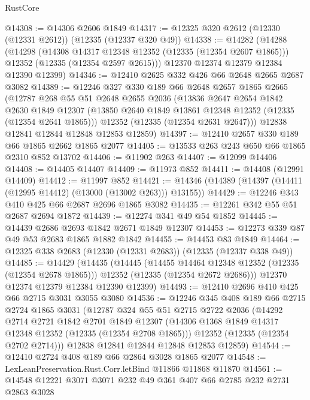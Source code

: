 \begin{lexlean}{RustCore}
\begin{coremodule}
@14308 := @14306 @2606 @1849
@14317 := @12325 @320 @2612 (@12330 (@12331 @2612)) (@12335 (@12337 @320 @49))
@14338 := @14282
    (@14288
      (@14298
        (@14308 @14317 @12348 @12352 (@12335 (@12354 @2607 @1865)))
        @12352
        (@12335 (@12354 @2597 @2615)))
      @12370
      @12374
      @12379
      @12384
      @12390
      @12399)
@14346 := @12410 @2625 @332 @426 @66 @2648 @2665 @2687 @3082
@14389 := @12246
    @327
    @330
    @189
    @66
    @2648
    @2657
    @1865
    @2665
    (@12787
      @268
      @55
      @51
      @2648
      @2655
      @2036
      (@13836
        @2647
        @2654
        @1842
        @2630
        @1849
        @12307
        (@13850 @2640 @1849 @13861 @12348 @12352 (@12335 (@12354 @2641 @1865)))
        @12352
        (@12335 (@12354 @2631 @2647)))
      @12838
      @12841
      @12844
      @12848
      @12853
      @12859)
@14397 := @12410 @2657 @330 @189 @66 @1865 @2662 @1865 @2077
@14405 := @13533 @263 @243 @650 @66 @1865 @2310 @852 @13702
@14406 := @11902 @263
@14407 := @12099 @14406
@14408 := @14405 @14407
@14409 := @11973 @852
@14411 := @14408 (@12991 @14409)
@14412 := @11997 @852
@14421 := @14346 (@14389 (@14397 (@14411 (@12995 @14412) (@13000 (@13002 @263))) @13155))
@14429 := @12246 @343 @410 @425 @66 @2687 @2696 @1865 @3082
@14435 := @12261 @342 @55 @51 @2687 @2694 @1872
@14439 := @12274 @341 @49 @54 @1852
@14445 := @14439 @2686 @2693 @1842 @2671 @1849 @12307
@14453 := @12273 @339 @87 @49 @53 @2683 @1865 @1882 @1842
@14455 := @14453 @83 @1849
@14464 := @12325 @338 @2683 (@12330 (@12331 @2683)) (@12335 (@12337 @338 @49))
@14485 := @14429
    (@14435
      (@14445
        (@14455 @14464 @12348 @12352 (@12335 (@12354 @2678 @1865)))
        @12352
        (@12335 (@12354 @2672 @2686)))
      @12370
      @12374
      @12379
      @12384
      @12390
      @12399)
@14493 := @12410 @2696 @410 @425 @66 @2715 @3031 @3055 @3080
@14536 := @12246
    @345
    @408
    @189
    @66
    @2715
    @2724
    @1865
    @3031
    (@12787
      @324
      @55
      @51
      @2715
      @2722
      @2036
      (@14292
        @2714
        @2721
        @1842
        @2701
        @1849
        @12307
        (@14306 @1368 @1849 @14317 @12348 @12352 (@12335 (@12354 @2708 @1865)))
        @12352
        (@12335 (@12354 @2702 @2714)))
      @12838
      @12841
      @12844
      @12848
      @12853
      @12859)
@14544 := @12410 @2724 @408 @189 @66 @2864 @3028 @1865 @2077
@14548 := LexLeanPreservation.Rust.Corr.letBind @11866 @11868 @11870
@14561 := @14548 @12221 @3071 @3071 @232 @49 @361 @407 @66 @2785 @232 @2731 @2863 @3028

\end{coremodule}
\end{lexlean}
